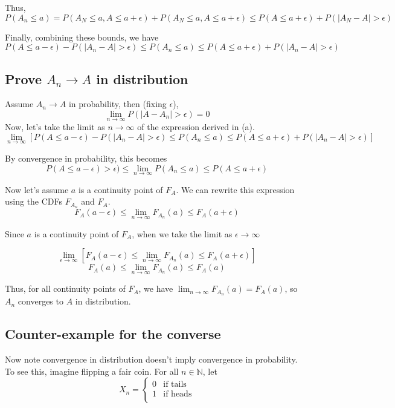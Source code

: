 \documentclass[paper=a4, fontsize=11pt]{scrartcl} %
\numberwithin{equation}{section} %
\numberwithin{figure}{section} %
\numberwithin{table}{section} %
\begin{document}
Thus,
\[P(A_n \leq a) = P(A_N \leq a, A \leq a + \epsilon) + P(A_N \leq a, A \leq a + \epsilon) \leq  P(A \leq a + \epsilon) +  P(|A_N - A| > \epsilon) \]

Finally, combining these bounds, we have 
\[P(A\leq a - \epsilon) - P(|A_n - A| > \epsilon) \leq P(A_n \leq a) \leq P(A \leq a + \epsilon) + P(|A_n - A| > \epsilon)\]

\subsection{Prove $A_n \to A$ in distribution}

Assume $A_n \to A$ in probability, then (fixing $\epsilon$),
\[\lim_{n \to \infty} P(|A - A_n| > \epsilon) = 0\]
Now, let's take the limit as $n \to \infty$ of the expression derived in (a).
\[\lim_{n \to \infty} \left[P(A\leq a - \epsilon) - P(|A_n - A| > \epsilon) \leq P(A_n \leq a) \leq P(A \leq a + \epsilon) + P(|A_n - A| > \epsilon)\right]\]

By convergence in probability, this becomes
\[P(A\leq a - \epsilon)> \epsilon) \leq \lim_{n \to \infty}P(A_n \leq a) \leq P(A \leq a + \epsilon)\]

Now let's assume $a$ is a continuity point of $F_A$. We can rewrite this expression using the CDFs $F_{A_n}$ and $F_A$.
\[F_A(a - \epsilon) \leq  \lim_{n \to \infty}F_{A_n}(a) \leq F_A(a + \epsilon) \]
 
Since $a$ is a continuity point of $F_A$, when we take the limit as $\epsilon \to \infty$

\[\lim_{\epsilon \to \infty} \left[F_A(a - \epsilon) \leq  \lim_{n \to \infty}F_{A_n}(a) \leq F_A(a + \epsilon)\right] \]
\[F_A(a) \leq  \lim_{n \to \infty}F_{A_n}(a) \leq F_A(a) \]

Thus, for all continuity points of $F_{A}$, we have $\lim_{n \to \infty}F_{A_n}(a) = F_A(a)$, so $A_n$ converges to $A$ in distribution.

\subsection{Counter-example for the converse}

Now note convergence in distribution doesn't imply convergence in probability. To see this, imagine flipping a fair coin. For all $n \in \mathbb{N}$, let
\[
X_n =
\begin{cases}
 0 & \textrm{if tails}\\
 1 & \textrm{if heads}\\
\end{cases}
\]
\end{document}
